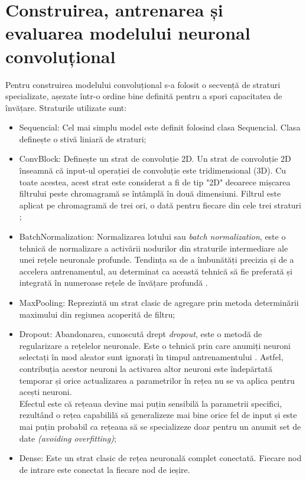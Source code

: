 \documentclass[a4paper,12pt]{report}
\begin{document}
\newpage
\section{Construirea, antrenarea și evaluarea modelului neuronal convoluțional}

Pentru construirea modelului convoluțional s-a folosit o secvență de
straturi specializate, așezate într-o ordine bine definită pentru 
a spori capacitatea de învățare. Straturile utilizate sunt:
\begin{itemize}
    \item Sequencial: Cel mai simplu model este definit folosind clasa Sequencial. Clasa definește 
o stivă liniară de straturi;
    \item ConvBlock: Definește un strat de convoluție 2D. Un strat de convoluție 2D înseamnă că 
    input-ul operației de convoluție este tridimensional (3D). Cu toate acestea, acest strat este considerat a fi de tip "2D" 
    deoarece mișcarea filtrului peste chromagramă
    se întâmplă în două dimensiuni. Filtrul este aplicat pe chromagramă de trei ori, 
    o dată pentru fiecare din cele trei straturi \cite{WEBSITE:conv2d-working-cnn};
    \item BatchNormalization: Normalizarea lotului sau \emph{batch normalization},
este o tehnică de normalizare a activării nodurilor din straturile intermediare 
ale unei rețele neuronale profunde. Tendința sa de a îmbunătăți precizia și de a 
accelera antrenamentul, au determinat ca această tehnică să fie preferată și
integrată în numeroase rețele de învățare profundă \cite{Understanding-Batch-Normalization}.
    \item MaxPooling: Reprezintă un strat clasic de agregare prin metoda 
determinării maximului din regiunea acoperită de filtru; 
    \item Dropout: Abandonarea, cunoscută drept \emph{dropout}, este o metodă de regularizare 
a rețelelor neuronale. Este o tehnică prin care anumiți neuroni selectați în mod aleator sunt ignorați
în timpul antrenamentului \cite{Hands-On-Machine-Learning}. Astfel, contribuția acestor neuroni la activarea altor neuroni este
îndepărtată temporar și orice actualizarea a parametrilor în rețea nu se va aplica pentru
acești neuroni. \\
Efectul este că rețeaua devine mai puțin sensibilă la parametrii specifici, rezultând o rețea 
capabililă să generalizeze mai bine orice fel de input și este mai puțin probabil ca rețeaua 
să se specializeze doar pentru un anumit set de date \emph{(avoiding overfitting)};
    \item Dense: Este un strat clasic de rețea neuronală complet conectată.
    Fiecare nod de intrare este conectat la fiecare nod de ieșire.
\end{itemize}
\end{document}

